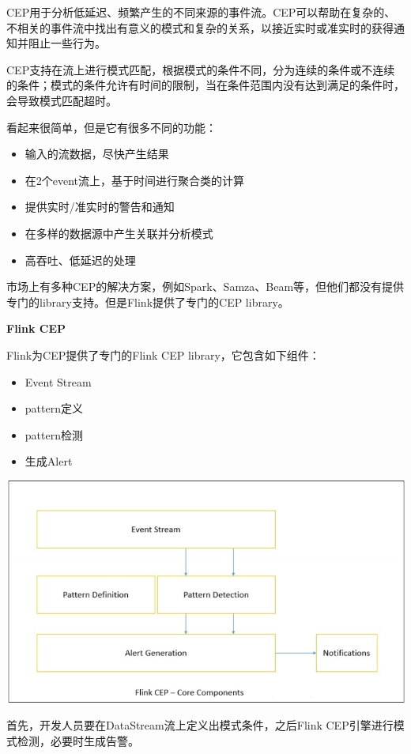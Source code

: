 \documentclass[oneside]{ctexbook}
\begin{document}
CEP用于分析低延迟、频繁产生的不同来源的事件流。CEP可以帮助在复杂的、不相关的事件流中找出有意义的模式和复杂的关系，以接近实时或准实时的获得通知并阻止一些行为。

CEP支持在流上进行模式匹配，根据模式的条件不同，分为连续的条件或不连续的条件；模式的条件允许有时间的限制，当在条件范围内没有达到满足的条件时，会导致模式匹配超时。

看起来很简单，但是它有很多不同的功能：

\begin{itemize}
\item 输入的流数据，尽快产生结果
\item 在2个event流上，基于时间进行聚合类的计算
\item 提供实时/准实时的警告和通知
\item 在多样的数据源中产生关联并分析模式
\item 高吞吐、低延迟的处理
\end{itemize}

市场上有多种CEP的解决方案，例如Spark、Samza、Beam等，但他们都没有提供专门的library支持。但是Flink提供了专门的CEP library。

\textbf{Flink CEP}

Flink为CEP提供了专门的Flink CEP library，它包含如下组件：

\begin{itemize}
\item Event Stream
\item pattern定义
\item pattern检测
\item 生成Alert
\end{itemize}

\noindent \includegraphics[width=\textwidth]{cep6.png}

首先，开发人员要在DataStream流上定义出模式条件，之后Flink CEP引擎进行模式检测，必要时生成告警。
\end{document}
